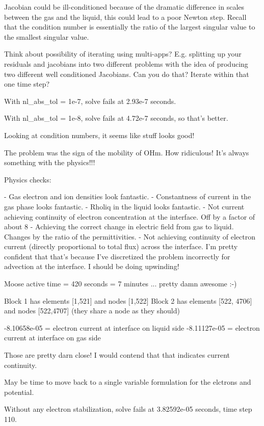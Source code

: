 {Jacobian could be ill-conditioned because of the dramatic difference in scales between the gas and the liquid, this could lead to a poor Newton step. Recall that the condition number is essentially the ratio of the largest singular value to the smallest singular value.

Think about possibility of iterating using multi-apps? E.g. splitting up your residuals and jacobians into two different problems with the idea of producing two different well conditioned Jacobians. Can you do that? Iterate within that one time step?

With nl_abs_tol = 1e-7, solve fails at 2.93e-7 seconds.

With nl_abs_tol = 1e-8, solve fails at 4.72e-7 seconds, so that's better.

Looking at condition numbers, it seems like stuff looks good!

The problem was the sign of the mobility of OHm. How ridiculous! It's always something with the physics!!!

Physics checks:

 - Gas electron and ion densities look fantastic.
 - Constantness of current in the gas phase looks fantastic.
 - Rholiq in the liquid looks fantastic.
 - Not current achieving continuity of electron concentration at the interface. Off by a factor of about 8
 - Achieving the correct change in electric field from gas to liquid. Changes by the ratio of the permittivities.
 - Not achieving continuity of electron current (directly proportional to total flux) across the interface. I'm pretty confident that that's because I've discretized the problem incorrectly for advection at the interface. I should be doing upwinding!

Moose active time = 420 seconds = 7 minutes ... pretty damn awesome :-)

Block 1 has elements [1,521] and nodes [1,522]
Block 2 has elements [522, 4706] and nodes [522,4707] (they share a node as they should)

-8.10658e-05 = electron current at interface on liquid side
-8.11127e-05 = electron current at interface on gas side

Those are pretty darn close! I would contend that that indicates current continuity.

May be time to move back to a single variable formulation for the elctrons and potential.

Without any electron stabilization, solve fails at 3.82592e-05 seconds, time step 110.

}
